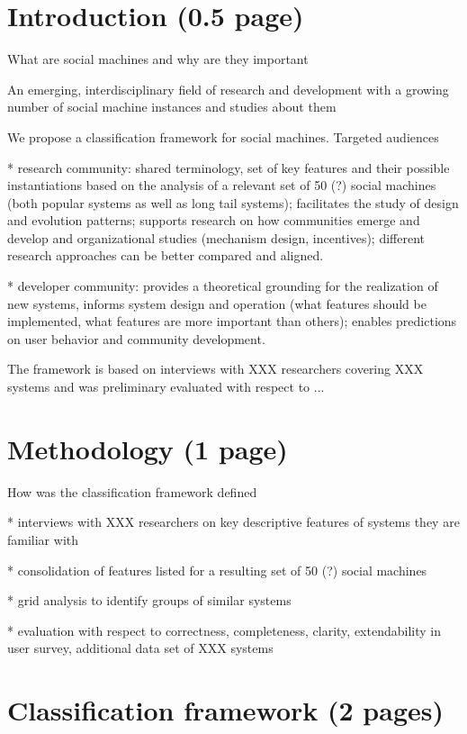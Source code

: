\documentclass{sig-alternate}
\begin{document}
\section{Introduction (0.5 page)}

What are social machines and why are they important

An emerging, interdisciplinary field of research and development with a growing number of social machine instances and studies about them

We propose a classification framework for social machines. Targeted audiences

* research community: shared terminology, set of key features and their possible instantiations based on the analysis of a relevant set of 50 (?) social machines (both popular systems as well as long tail systems); facilitates the study of design and evolution patterns; supports research on how communities emerge and develop and organizational studies (mechanism design, incentives); different research approaches can be better compared and aligned.

* developer community: provides a theoretical grounding for the realization of new systems, informs system design and operation (what features should be implemented, what features are more important than others); enables predictions on user behavior and community development.

The framework is based on interviews with XXX researchers covering XXX systems and was preliminary evaluated with respect to ...


\section{Methodology (1 page)}

How was the classification framework defined

* interviews with XXX researchers on key descriptive features of systems they are familiar with

* consolidation of features listed for a resulting set of 50 (?) social machines

* grid analysis to identify groups of similar systems

* evaluation with respect to correctness, completeness, clarity, extendability in user survey, additional data set of XXX systems


\section{Classification framework (2 pages)}
\end{document}
